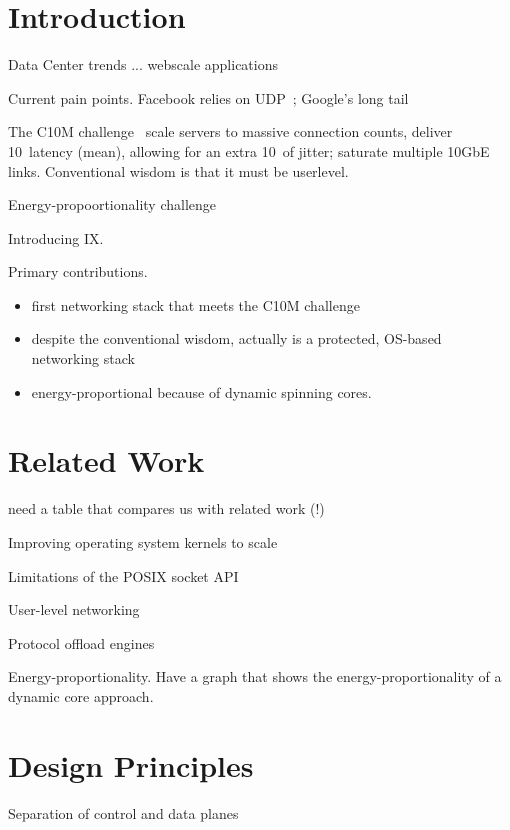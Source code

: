
\section{Introduction}

\todo Data Center trends ... webscale applications

\todo Current pain points.  Facebook relies on UDP~\cite{nishtala2013scaling}; Google's long tail~\cite{DBLP:journals/cacm/DeanB13}

\todo The C10M challenge~\cite{theC10Mproblem}  scale servers to massive connection counts, deliver 10\microsecond~latency (mean), allowing for an extra 10\microsecond~of jitter; saturate multiple 10GbE links.   Conventional wisdom is that it must be userlevel.

\todo Energy-propoortionality challenge~\cite{DBLP:journals/computer/BarrosoH07}

\todo Introducing IX.

\todo Primary contributions. 

\begin{itemize}
\item first networking stack that meets the C10M challenge
\item despite the conventional wisdom, actually is a protected, OS-based networking stack
\item energy-proportional because of dynamic spinning cores.
\end{itemize}



\section{Related Work}

\todo need a table that compares us with related work (!)

\todo Improving operating system kernels to scale

\todo Limitations of the POSIX socket API

\todo User-level networking

\todo Protocol offload engines

\todo Energy-proportionality.   Have a graph that shows the energy-proportionality of a dynamic core approach.


\section{Design Principles}

\todo Separation of control and data planes

